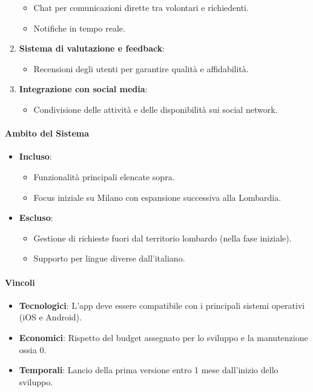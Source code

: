 \begin{enumerate}
\begin{itemize}
    \item Chat per comunicazioni dirette tra volontari e richiedenti.
    \item Notifiche in tempo reale.
    \end{itemize}
\item \textbf{Sistema di valutazione e feedback}:
    \begin{itemize}
    \item Recensioni degli utenti per garantire qualità e affidabilità.
    \end{itemize}
\item \textbf{Integrazione con social media}:
    \begin{itemize}
    \item Condivisione delle attività e delle disponibilità sui social network.
    \end{itemize}
\end{enumerate}

\paragraph{Ambito del Sistema}
\begin{itemize}
\item \textbf{Incluso}:
    \begin{itemize}
    \item Funzionalità principali elencate sopra.
    \item Focus iniziale su Milano con espansione successiva alla Lombardia.
    \end{itemize}
\item \textbf{Escluso}:
    \begin{itemize}
    \item Gestione di richieste fuori dal territorio lombardo (nella fase iniziale).
    \item Supporto per lingue diverse dall'italiano.
    \end{itemize}
\end{itemize}

\paragraph{Vincoli}
\begin{itemize}
\item \textbf{Tecnologici}: L'app deve essere compatibile con i principali sistemi operativi (iOS e Android).
\item \textbf{Economici}: Rispetto del budget assegnato per lo sviluppo e la manutenzione ossia 0.
\item \textbf{Temporali}: Lancio della prima versione entro 1 mese dall'inizio dello sviluppo.
\end{itemize}

